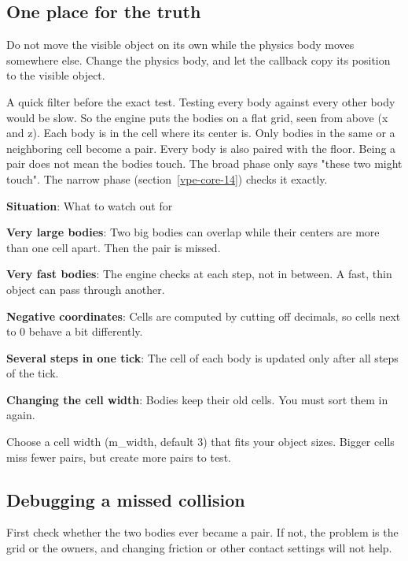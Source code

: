 \documentclass[11pt,a4paper]{article}
\begin{document}
\subsection*{One place for the truth}
Do not move the visible object on its own while the physics body moves somewhere else. Change the physics body, and let the callback copy its position to the visible object.

\label{vpe-core-13}
A quick filter before the exact test. Testing every body against every other body would be slow. So the engine puts the bodies on a flat grid, seen from above (x and z). Each body is in the cell where its center is. Only bodies in the same or a neighboring cell become a pair. Every body is also paired with the floor. Being a pair does not mean the bodies touch. The broad phase only says "these two might touch". The narrow phase (section~\ref{vpe-core-14}) checks it exactly.

\textbf{Situation}: What to watch out for

\textbf{Very large bodies}: Two big bodies can overlap while their centers are more than one cell apart. Then the pair is missed.

\textbf{Very fast bodies}: The engine checks at each step, not in between. A fast, thin object can pass through another.

\textbf{Negative coordinates}: Cells are computed by cutting off decimals, so cells next to 0 behave a bit differently.

\textbf{Several steps in one tick}: The cell of each body is updated only after all steps of the tick.

\textbf{Changing the cell width}: Bodies keep their old cells. You must sort them in again.

Choose a cell width (m\_width, default 3) that fits your object sizes. Bigger cells miss fewer pairs, but create more pairs to test.

\subsection*{Debugging a missed collision}
First check whether the two bodies ever became a pair. If not, the problem is the grid or the owners, and changing friction or other contact settings will not help.
\end{document}
